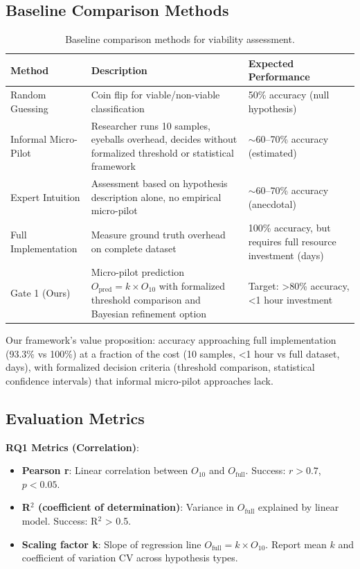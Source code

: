 \subsection{Baseline Comparison Methods}

\begin{table}[h]
\centering
\small
\begin{tabular}{lp{5.5cm}p{4cm}}
\toprule
\textbf{Method} & \textbf{Description} & \textbf{Expected Performance} \\
\midrule
Random Guessing & Coin flip for viable/non-viable classification & 50\% accuracy (null hypothesis) \\
\midrule
Informal Micro-Pilot & Researcher runs 10 samples, eyeballs overhead, decides without formalized threshold or statistical framework & $\sim$60--70\% accuracy (estimated) \\
\midrule
Expert Intuition & Assessment based on hypothesis description alone, no empirical micro-pilot & $\sim$60--70\% accuracy (anecdotal) \\
\midrule
Full Implementation & Measure ground truth overhead on complete dataset & 100\% accuracy, but requires full resource investment (days) \\
\midrule
Gate 1 (Ours) & Micro-pilot prediction $O_{\text{pred}} = k \times O_{10}$ with formalized threshold comparison and Bayesian refinement option & Target: >80\% accuracy, <1 hour investment \\
\bottomrule
\end{tabular}
\caption{Baseline comparison methods for viability assessment.}
\label{tab:baselines}
\end{table}

Our framework's value proposition: accuracy approaching full implementation (93.3\% vs 100\%) at a fraction of the cost (10 samples, <1 hour vs full dataset, days), with formalized decision criteria (threshold comparison, statistical confidence intervals) that informal micro-pilot approaches lack.

\subsection{Evaluation Metrics}

\textbf{RQ1 Metrics (Correlation)}:
\begin{itemize}
\item \textbf{Pearson r}: Linear correlation between $O_{10}$ and $O_{\text{full}}$. Success: $r > 0.7$, $p < 0.05$.
\item \textbf{R$^2$ (coefficient of determination)}: Variance in $O_{\text{full}}$ explained by linear model. Success: R$^2$ > 0.5.
\item \textbf{Scaling factor k}: Slope of regression line $O_{\text{full}} = k \times O_{10}$. Report mean $k$ and coefficient of variation CV across hypothesis types.
\end{itemize}

